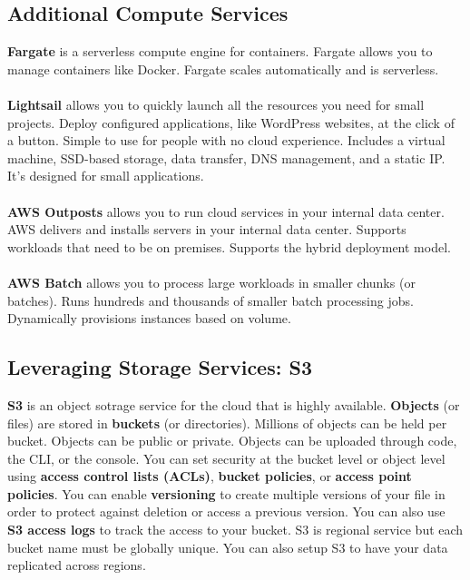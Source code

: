 \documentclass{article}%
\begin{document}
\subsection{Additional Compute Services}
\textbf{Fargate} is a serverless compute engine for containers. Fargate allows you to manage containers like Docker.
Fargate scales automatically and is serverless. \\ \\
\textbf{Lightsail} allows you to quickly launch all the resources you need for small projects. Deploy configured applications, like WordPress websites, at the click of a button. Simple to use for people with no cloud experience. Includes a virtual machine, SSD-based storage, data transfer, DNS management, and a static IP.
It's designed for small applications. \\ \\ 
\textbf{AWS Outposts} allows you to run cloud services in your internal data center. AWS delivers and installs servers in your internal data center. Supports workloads that need to be on premises. Supports the hybrid deployment model. \\ \\
\textbf{AWS Batch} allows you to process large workloads in smaller chunks (or batches). Runs hundreds and thousands of smaller batch processing jobs. Dynamically provisions instances based on volume. 



\subsection{Leveraging Storage Services: S3}
\textbf{S3} is an object sotrage service for the cloud that is highly available. \textbf{Objects} (or files) are stored in \textbf{buckets} (or directories). Millions of objects can be held per bucket. 
Objects can be public or private. Objects can be uploaded through code, the CLI, or the console. You can set security at the bucket level or object level using \textbf{access control lists (ACLs)}, \textbf{bucket policies}, or \textbf{access point policies}. You can enable \textbf{versioning} to create multiple versions of your file in order to protect against deletion or access a previous version. You can also use \textbf{S3 access logs} to track the access to your bucket. S3 is regional service but each bucket name must be globally unique. You can also setup S3 to have your data replicated across regions. \\ \\
\end{document}
